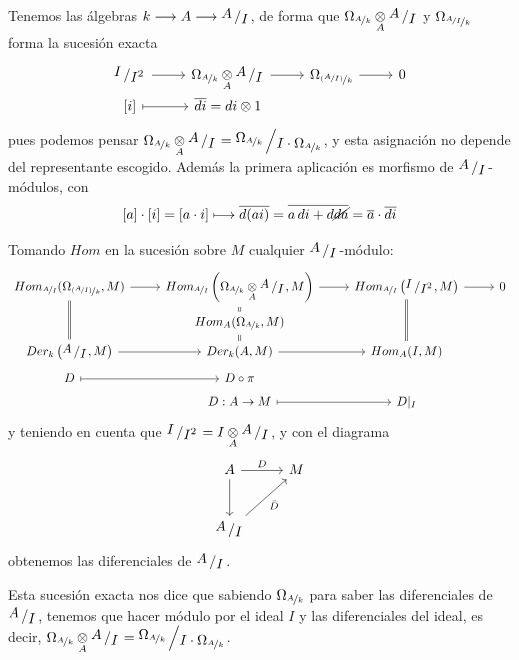 \begin{custom} 
    Tenemos las \'algebras $k \longrightarrow A \longrightarrow \modulo{A}{I}$, de forma que $\Omega_{\nicefrac{A}{k}} \underset{A}{\otimes} \modulo{A}{I}$ y $\Omega_{\nicefrac{\nicefrac{A}{I}}{k}}$ forma la sucesi\'on exacta
    $$\bt  \modulo{I}{I^2} \rar & \Omega_{\nicefrac{A}{k}} \underset{A}{\otimes} \modulo{A}{I}  \rar & \Omega_{\nicefrac{(\nicefrac{A}{I})}{k}} \rar & 0 \\[-7mm] [i] \rarmaps & \overline{di} = di \otimes 1 \et$$
    pues podemos pensar $ \Omega_{\nicefrac{A}{k}} \underset{A}{\otimes} \modulo{A}{I} =\modulo{\Omega_{\nicefrac{A}{k}}}{I\cdot \Omega_{\nicefrac{A}{k}}}$, y esta asignaci\'on no depende del representante escogido. Adem\'as la primera aplicaci\'on es morfismo de $\modulo{A}{I}$-m\'odulos, con 
    $$[a]\cdot [i] = [a\cdot i] \longmapsto \overline{d(ai)} = \overline{a \, di + d \cancel{da}} = \overline{a} \cdot \overline{di}$$ 

    Tomando $Hom$ en la sucesi\'on sobre $M$ cualquier $\modulo{A}{I}$-m\'odulo:
    $$\bt  
    Hom_{\nicefrac{A}{I}}(\Omega_{\nicefrac{(\nicefrac{A}{I})}{k}}, M) \rar &  Hom_{\nicefrac{A}{I}}\left(\Omega_{\nicefrac{A}{k}} \underset{A}{\otimes} \modulo{A}{I}, M\right)  \rar &  Hom_{\nicefrac{A}{I}}\left(\modulo{I}{I^2},M\right) \rar & 0 \\[-5mm] 
    & Hom_{A}(\Omega_{\nicefrac{A}{k}}, M ) \arrow[equal]{u}  \\[-5mm] 
    Der_k\left(\modulo{A}{I}, M\right) \arrow[equal]{uu} \rar & Der_k(A,M) \arrow[equal]{u} \rar  & Hom_A(I,M) \arrow[equal]{uu} \\[-5mm] D \rarmaps & D\circ \pi \\[-5mm] & D:A\to M \rarmaps & D|_{I} \et$$
    y teniendo en cuenta que $\modulo{I}{I^2} = I \underset{A}{\otimes} \modulo{A}{I}$, y con el diagrama $$\bt  A \rar{D} \arrow{d} & M \\[3mm] \modulo{A}{I} \arrow[swap]{ru}{\bar D} \et$$ obtenemos las diferenciales de $\modulo{A}{I}$.
\end{custom}
\begin{cor}
    Esta sucesi\'on exacta nos dice que sabiendo $\Omega_{\nicefrac{A}{k}}$ para saber las diferenciales de $\modulo{A}{I}$, tenemos que hacer m\'odulo por el ideal $I$ y las diferenciales del ideal, es decir, $\Omega_{\nicefrac{A}{k}} \underset{A}{\otimes} \modulo{A}{I} = \modulo{\Omega_{\nicefrac{A}{k}}}{I \cdot \Omega_{\nicefrac{A}{k}}}$. 
\end{cor}
